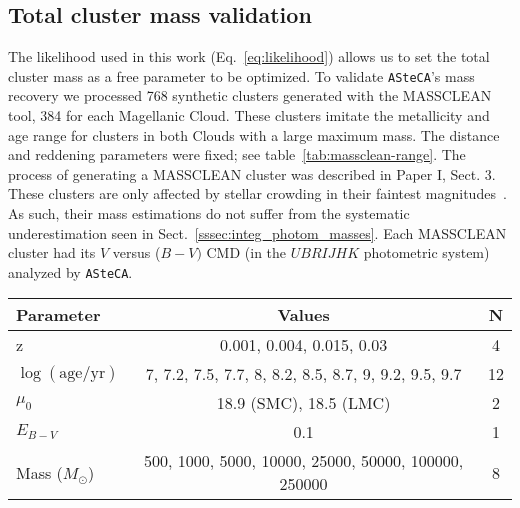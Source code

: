 \documentclass{aa}
\begin{document}
\begin{appendix}

\section{Total cluster mass validation}
\label{apdx:mass_valid}

The likelihood used in this work (Eq.~\ref{eq:likelihood}) allows
us to set the total cluster mass as a free parameter to be optimized.
To validate \texttt{ASteCA}'s mass recovery we processed 768 synthetic
clusters generated with the MASSCLEAN tool, 384 for each Magellanic Cloud.
%
These clusters imitate the metallicity and age range for clusters in
both Clouds with a large maximum mass. The distance and reddening parameters
were fixed; see table~\ref{tab:massclean-range}.
The process of generating a MASSCLEAN cluster was described in Paper I, Sect. 3.
These clusters are only affected by stellar crowding in their faintest
magnitudes~\citep[using a theoretical completeness function similar to that
presented in][]{Small_2013}. As such, their mass estimations do not suffer from
the systematic underestimation seen in Sect.~\ref{sssec:integ_photom_masses}.
%
Each MASSCLEAN cluster had its $V$ versus ($B-V)$ CMD (in the $UBRIJHK$
photometric system) analyzed by \texttt{ASteCA}.

\begin{table*}
\centering
\caption{Parameter values used to generate the set of 768 MASSCLEAN clusters.}
\label{tab:massclean-range}
\begin{tabular}{lcc}
\hline\hline
 Parameter & Values & N\\
\hline
z & 0.001, 0.004, 0.015, 0.03 & 4\\
$\log\mathrm{(age/yr)}$ & 7, 7.2, 7.5, 7.7, 8, 8.2, 8.5, 8.7, 9, 9.2, 9.5, 9.7 &
12\\
$\mu_0$ & 18.9 (SMC), 18.5 (LMC) & 2\\
$E_{B-V}$ & 0.1 & 1\\
Mass ($M_{\odot}$) & 500, 1000, 5000, 10000, 25000, 50000, 100000, 250000 & 8\\
\hline
\end{tabular}
\end{table*}


\end{appendix}
\end{document}

